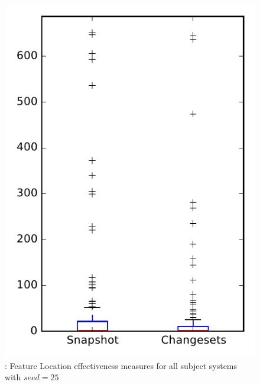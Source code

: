 
\begin{figure}
\centering
\includegraphics[height=0.4\textheight]{figures/flt_seed/rq1_overview_25}
\caption{\rone: Feature Location effectiveness measures for all subject systems with $seed=25$}
\label{fig:flt_seed:rq1:overview}
\end{figure}
